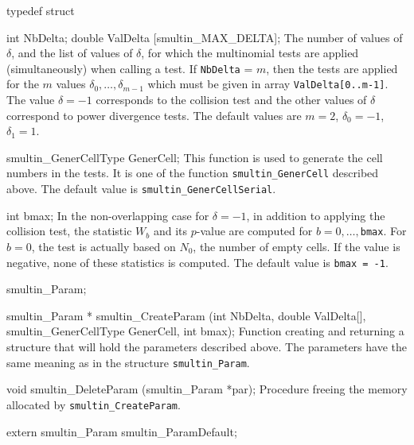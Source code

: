 typedef struct {

   int NbDelta;
   double ValDelta [smultin_MAX_DELTA];
\endcode
 \tabb
  The number of values of $\delta$, and the list of values of $\delta$,
  for which the multinomial tests are applied (simultaneously)
  when calling a test.  If {\tt NbDelta} = $m$, then the
  tests are applied for the $m$ values $\delta_0,\dots,\delta_{m-1}$
  which must be given in array {\tt ValDelta[0..m-1]}.
  The value $\delta = -1$ corresponds to the collision test
  and the other values of $\delta$ correspond to power divergence tests.
  The default values are $m=2$, $\delta_0 = -1$, $\delta_1 = 1$.
 \endtabb
\code

   smultin_GenerCellType GenerCell;
\endcode
\tabb
  This function is used to generate the cell numbers in the tests.
  It is one of the function {\tt smultin\_GenerCell} described above.
  The default value is {\tt smultin\_GenerCellSerial}.
\endtabb
\code

   int bmax;
\endcode
 \tabb  In the non-overlapping case for $\delta = -1$, in addition to
   applying the collision test, the statistic $W_b$ and its $p$-value
   are computed for $b=0,\dots,${\tt bmax}.
   For $b=0$, the test is actually based on $N_0$, the number of
   empty cells.
   If the value is negative, none of these statistics is computed.
   The default value is {\tt bmax = -1}.
 \endtabb
\code

} smultin_Param;


smultin_Param * smultin_CreateParam (int NbDelta, double ValDelta[],
                                     smultin_GenerCellType GenerCell,
                                     int bmax);
\endcode
 \tab
  Function creating and returning a structure that will hold the
  parameters described above.  The parameters have
  the same meaning as in the structure {\tt smultin\_Param}.
 \endtab
\code


void smultin_DeleteParam (smultin_Param *par);
\endcode
 \tab
  Procedure freeing the memory allocated by {\tt smultin\_CreateParam}.
 \endtab

\hide
\code

extern smultin_Param smultin_ParamDefault;
\endcode
\endhide



\ifdetailed  %

